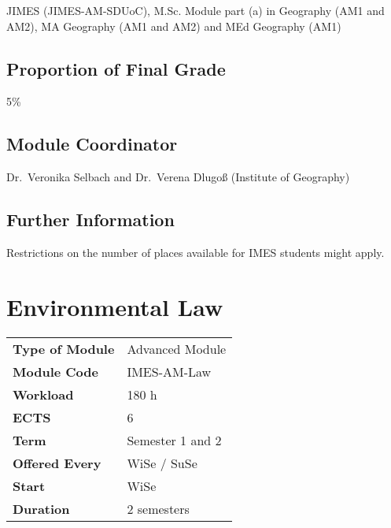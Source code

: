 \documentclass[
  letterpaper,
  10pt,
  openany]{book}
\begin{document}

JIMES (JIMES-AM-SDUoC), M.Sc. Module part (a) in Geography (AM1 and
AM2), MA Geography (AM1 and AM2) and MEd Geography (AM1)

\section*{Proportion of Final Grade}\label{proportion-of-final-grade-1}


5\%

\section*{Module Coordinator}\label{module-coordinator-1}


Dr.~Veronika Selbach and Dr.~Verena Dlugoß (Institute of Geography)

\section*{Further Information}\label{further-information-1}


Restrictions on the number of places available for IMES students might
apply.

\chapter*{Environmental Law}\label{environmental-law}


\begin{longtable}[]{@{}ll@{}}
\toprule\noalign{}
\endhead
\bottomrule\noalign{}
\endlastfoot
\textbf{Type of Module} & Advanced Module \\
\textbf{Module Code} & IMES-AM-Law \\
\textbf{Workload} & 180 h \\
\textbf{ECTS} & 6 \\
\textbf{Term} & Semester 1 and 2 \\
\textbf{Offered Every} & WiSe / SuSe \\
\textbf{Start} & WiSe \\
\textbf{Duration} & 2 semesters \\
\end{longtable}
\end{document}
